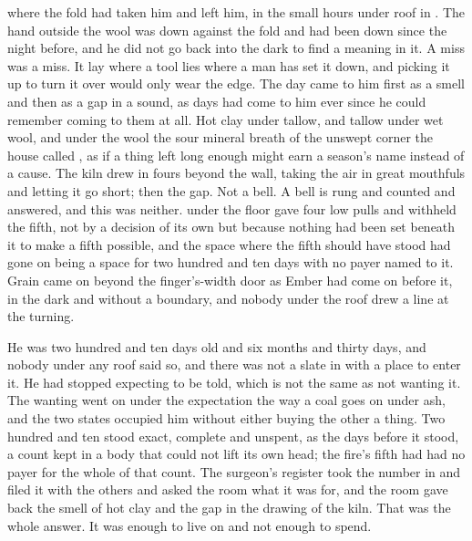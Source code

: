 
 where the fold had taken him and left him, in the small hours under  roof in . The hand outside the wool was down against the fold and had been down since the night before, and he did not go back into the dark to find a meaning in it. A miss was a miss. It lay where a tool lies where a man has set it down, and picking it up to turn it over would only wear the edge. The day came to him first as a smell and then as a gap in a sound, as days had come to him ever since he could remember coming to them at all. Hot clay under tallow, and tallow under wet wool, and under the wool the sour mineral breath of the unswept corner the house called , as if a thing left long enough might earn a season's name instead of a cause. The kiln drew in fours beyond the wall, taking the air in great mouthfuls and letting it go short; then the gap. Not a bell. A bell is rung and counted and answered, and this was neither.  under the floor gave four low pulls and withheld the fifth, not by a decision of its own but because nothing had been set beneath it to make a fifth possible, and the space where the fifth should have stood had gone on being a space for two hundred and ten days with no payer named to it. Grain came on beyond the finger's-width door as Ember had come on before it, in the dark and without a boundary, and nobody under the roof drew a line at the turning.

He was two hundred and ten days old and six months and thirty days, and nobody under any roof said so, and there was not a slate in  with a place to enter it. He had stopped expecting to be told, which is not the same as not wanting it. The wanting went on under the expectation the way a coal goes on under ash, and the two states occupied him without either buying the other a thing. Two hundred and ten stood exact, complete and unspent, as the days before it stood, a count kept in a body that could not lift its own head; the fire's fifth had had no payer for the whole of that count. The surgeon's register took the number in and filed it with the others and asked the room what it was for, and the room gave back the smell of hot clay and the gap in the drawing of the kiln. That was the whole answer. It was enough to live on and not enough to spend.

